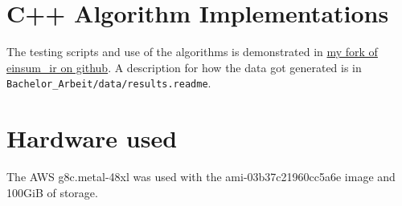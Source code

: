 \appendix

\section{C++ Algorithm Implementations}

The testing scripts and use of the algorithms is demonstrated in 
\href{https://github.com/Minutenreis/einsum_ir}{my fork of einsum\_ir on github}.
A description for how the data got generated is in \\
\texttt{Bachelor\_Arbeit/data/results.readme}.

\section{Hardware used}

The AWS g8c.metal-48xl was used with the ami-03b37c21960cc5a6e image and 100GiB of storage.
